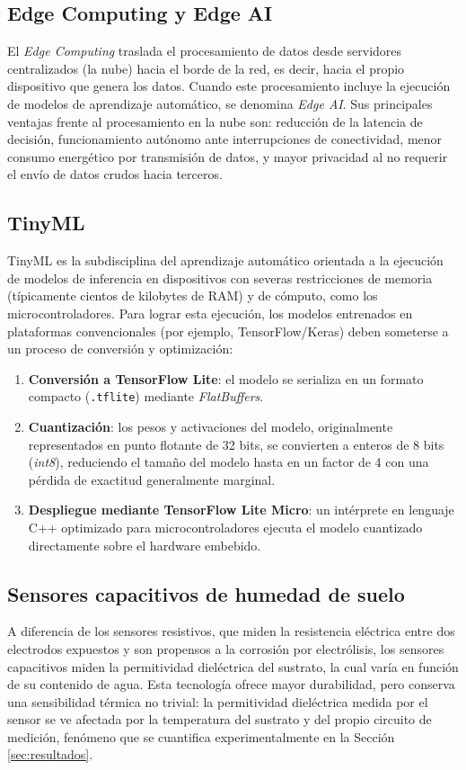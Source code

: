 \documentclass[12pt,a4paper]{article}
\begin{document}
\subsection{Edge Computing y Edge AI}
El \textit{Edge Computing} traslada el procesamiento de datos desde servidores centralizados (la nube) hacia el borde de la red, es decir, hacia el propio dispositivo que genera los datos. Cuando este procesamiento incluye la ejecución de modelos de aprendizaje automático, se denomina \textit{Edge AI}. Sus principales ventajas frente al procesamiento en la nube son: reducción de la latencia de decisión, funcionamiento autónomo ante interrupciones de conectividad, menor consumo energético por transmisión de datos, y mayor privacidad al no requerir el envío de datos crudos hacia terceros.

\subsection{TinyML}
TinyML es la subdisciplina del aprendizaje automático orientada a la ejecución de modelos de inferencia en dispositivos con severas restricciones de memoria (típicamente cientos de kilobytes de RAM) y de cómputo, como los microcontroladores. Para lograr esta ejecución, los modelos entrenados en plataformas convencionales (por ejemplo, TensorFlow/Keras) deben someterse a un proceso de conversión y optimización:

\begin{enumerate}
    \item \textbf{Conversión a TensorFlow Lite}: el modelo se serializa en un formato compacto (\texttt{.tflite}) mediante \textit{FlatBuffers}.
    \item \textbf{Cuantización}: los pesos y activaciones del modelo, originalmente representados en punto flotante de 32 bits, se convierten a enteros de 8 bits (\textit{int8}), reduciendo el tamaño del modelo hasta en un factor de 4 con una pérdida de exactitud generalmente marginal.
    \item \textbf{Despliegue mediante TensorFlow Lite Micro}: un intérprete en lenguaje C++ optimizado para microcontroladores ejecuta el modelo cuantizado directamente sobre el hardware embebido.
\end{enumerate}

\subsection{Sensores capacitivos de humedad de suelo}
A diferencia de los sensores resistivos, que miden la resistencia eléctrica entre dos electrodos expuestos y son propensos a la corrosión por electrólisis, los sensores capacitivos miden la permitividad dieléctrica del sustrato, la cual varía en función de su contenido de agua. Esta tecnología ofrece mayor durabilidad, pero conserva una sensibilidad térmica no trivial: la permitividad dieléctrica medida por el sensor se ve afectada por la temperatura del sustrato y del propio circuito de medición, fenómeno que se cuantifica experimentalmente en la Sección \ref{sec:resultados}.
\end{document}

